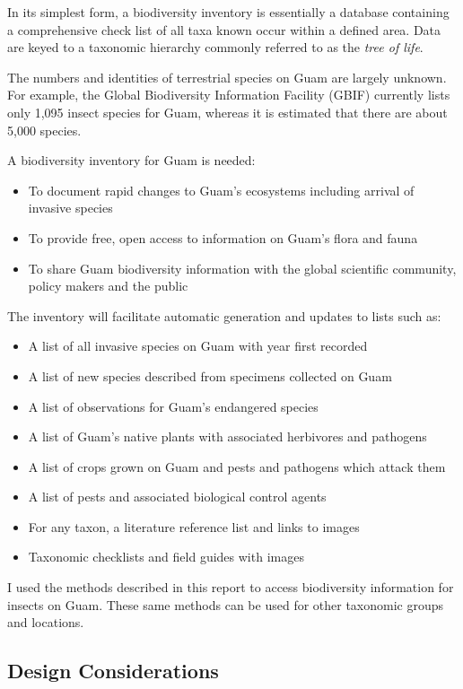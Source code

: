 \documentclass[12pt,letterpaper,english,bibliography=totocnumbered, abstract=on]{scrartcl}
\begin{document}
In its simplest form, a biodiversity inventory is essentially a database containing a comprehensive check list of all taxa known occur within a defined area. Data are keyed to a taxonomic hierarchy commonly referred to as the \textit{tree of life}. 

The numbers and identities of terrestrial species on Guam are largely unknown. For example, the Global Biodiversity Information Facility (GBIF) currently lists only 1,095 insect species for Guam, whereas it is estimated that there are about 5,000 species.

A biodiversity inventory for Guam is needed:

\begin{itemize}
	\item To document rapid changes to Guam’s ecosystems including arrival of invasive species
	\item To provide free, open access to information on Guam’s flora and fauna
	\item To share Guam biodiversity information with the global scientific community, policy makers and the public
\end{itemize}

The inventory will facilitate automatic generation and updates to lists such as:
\begin{itemize}
	\item A list of all invasive species on Guam with year first recorded
	\item A list of new species described from specimens collected on Guam
	\item A list of observations for Guam’s endangered species
	\item A list of Guam’s native plants with associated herbivores and pathogens
	\item A list of crops grown on Guam and pests and pathogens which attack them
	\item A list of pests and associated biological control agents
	\item For any taxon, a literature reference list and links to images
	\item Taxonomic checklists and field guides with images
\end{itemize}

I used the methods described in this report to access biodiversity information for insects on Guam. These same methods can be used for other taxonomic groups and locations.

\subsection{Design Considerations}
\end{document}
